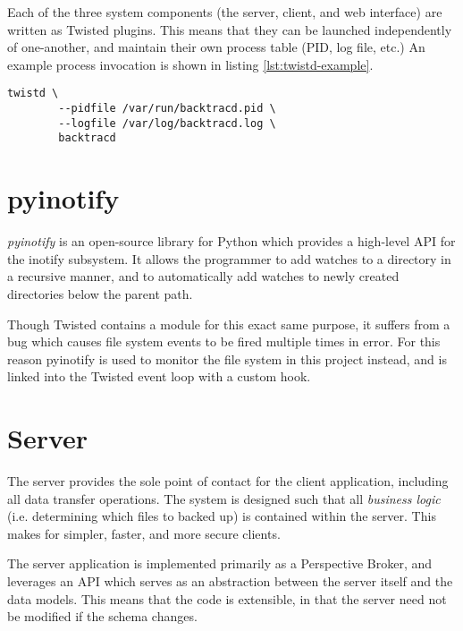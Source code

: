 Each of the three system components (the server, client, and web interface) are
written as Twisted plugins. This means that they can be launched independently
of one-another, and maintain their own process table (PID, log file, etc.) An
example process invocation is shown in listing \ref{lst:twistd-example}.

\begin{singlespacing}
\begin{lstlisting}[caption=An example twistd invocation,
    label=lst:twistd-example]
    twistd \
        --pidfile /var/run/backtracd.pid \
        --logfile /var/log/backtracd.log \
        backtracd
\end{lstlisting}
\end{singlespacing}

\section{pyinotify}
\label{sec:implementation-pyinotify}

\emph{pyinotify} is an open-source library for Python which provides
a high-level API for the inotify subsystem. It allows the programmer to add
watches to a directory in a recursive manner, and to automatically add watches
to newly created directories below the parent path.

Though Twisted contains a module for this exact same purpose, it suffers from
a bug which causes file system events to be fired multiple times in error. For
this reason pyinotify is used to monitor the file system in this project
instead, and is linked into the Twisted event loop with a custom hook.

\section{Server}
\label{sec:implementation-server}

The server provides the sole point of contact for the client application,
including all data transfer operations. The system is designed such that all
\emph{business logic} (i.e. determining which files to backed up) is contained
within the server. This makes for simpler, faster, and more secure clients.

The server application is implemented primarily as a Perspective Broker, and
leverages an API which serves as an abstraction between the server itself and
the data models. This means that the code is extensible, in that the server
need not be modified if the schema changes.


